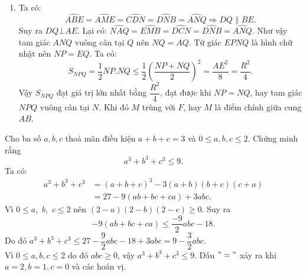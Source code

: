 \begin{ex}
{\begin{enumerate}
				Ta có $\widehat{BOE}=2\widehat{BME}=\widehat{DIN}={{90}^{0}}$.
				Hai tam giác vuông $EON$ và $EMF$ có góc $E$ chung nên đồng dạng với nhau.
				Suy ra:
				\[\frac{EO}{EM}=\frac{EN}{EF} \Rightarrow EM.EN=EO.EF=2R^2.\]
				\item  Ta có:
				$$\widehat {ABE} = \widehat {AME} = \widehat {CDN} = \widehat {DNB} = \widehat {ANQ} \Rightarrow DQ \parallel BE.$$
				Suy ra $DQ \bot AE$.
				Lại có: $\widehat {NAQ} = \widehat {EMB} = \widehat {DCN} = \widehat {DNB} = \widehat {ANQ}$. Như vậy tam giác $ANQ$ vuông cân tại $Q$ nên $NQ = AQ$.
				Tứ giác $EPNQ$ là hình chữ nhật nên $NP = EQ$. Ta có:
				\[{{S}_{NPQ}}=\frac{1}{2}NP.NQ\le \frac{1}{2}{{\left( \frac{NP+NQ}{2} \right)}^{2}}= \frac{A{{E}^{2}}}{8}=\frac{{{R}^{2}}}{4}.\] 
				Vậy ${{S}_{NPQ}}$ đạt giá trị lớn nhất bằng $\dfrac{{{R}^{2}}}{4}$, đạt được khi $NP=NQ$, hay tam giác $NPQ$ vuông cân tại $N$.  Khi đó $M$ trùng với $F$, hay $M$ là điểm chính giữa cung $AB$.     
			\end{enumerate}
		}
	\end{ex}
	

	
	\begin{ex}%
		Cho ba số $a, b, c$ thoả mãn điều kiện $a+b+c=3$ và $0\le a, b, c\le 2$. Chứng minh rằng 
		\[a^{3}+ b^{3}+ c^{3}\le 9.\]
		\loigiai
		{Ta có:
			{\allowdisplaybreaks
				\begin{align*}
				a^{3}+ b^{3}+ c^{3}&=(a+b+c)^{3}- 3(a+b)(b+c)(c+a)\\
				&= 27- 9(ab+bc+ca)+ 3abc.
				\end{align*}}Vì $0\le a,\,\,b,\,\,c\le 2$ nên $(2-a)(2-b)(2-c) \ge 0$.
			Suy ra 
			$$-9(ab+bc+ca) \le \dfrac{-9}{2}abc -18.$$
			Do đó $a^{3}+ b^{3}+ c^{3}\le 27-\dfrac{9}{2}abc -18 +3abc=9-\dfrac{3}{2}abc$.\\ 
			Vì $0 \le a,b,c \le 2$ do đó $abc \ge 0$, vậy $a^{3}+ b^{3}+ c^{3} \le 9$. Dấu $"="$ xảy ra khi $a= 2, b=1, c=0$ và các hoán vị.
		}
	\end{ex}

